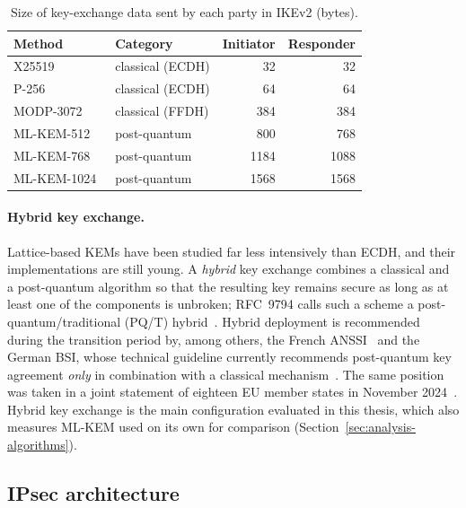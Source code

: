 \begin{table}[!h] \centering
    \caption{Size of key-exchange data sent by each party in IKEv2 (bytes).}
    \label{tab:ke-sizes}
    \begin{tabular}{| l | l | r | r |} \hline
        Method & Category & Initiator & Responder \\ \hline\hline
        X25519~\cite{rfc8031}           & classical (ECDH) & 32   & 32   \\ \hline
        P-256~\cite{rfc5903}            & classical (ECDH) & 64   & 64   \\ \hline
        MODP-3072~\cite{rfc3526}        & classical (FFDH) & 384  & 384  \\ \hline
        ML-KEM-512~\cite{fips203}       & post-quantum     & 800  & 768  \\ \hline
        ML-KEM-768~\cite{fips203}       & post-quantum     & 1184 & 1088 \\ \hline
        ML-KEM-1024~\cite{fips203}      & post-quantum     & 1568 & 1568 \\ \hline
    \end{tabular}
\end{table}

\paragraph{Hybrid key exchange.}
Lattice-based KEMs have been studied far less intensively than ECDH, and their
implementations are still young. A \emph{hybrid} key exchange combines a
classical and a post-quantum algorithm so that the resulting key remains secure
as long as at least one of the components is unbroken; RFC~9794 calls such
a scheme a post-quantum/traditional (PQ/T) hybrid~\cite{rfc9794}. Hybrid deployment is
recommended during the transition period by, among others, the French
ANSSI~\cite{anssi2023} and the German BSI, whose technical guideline currently
recommends post-quantum key agreement \emph{only} in combination with
a classical mechanism~\cite{bsiTr02102}. The same position was taken in a joint
statement of eighteen EU member states in November 2024~\cite{jointPqc2024}.
Hybrid key exchange is the main configuration evaluated in this thesis, which
also measures ML-KEM used on its own for comparison
(Section~\ref{sec:analysis-algorithms}).

\subsection{IPsec architecture}
\label{sec:sota-ipsec}

